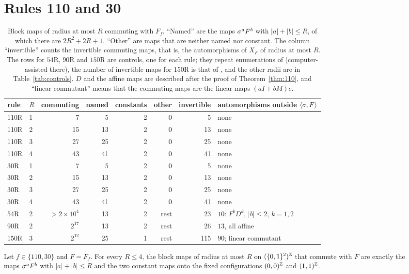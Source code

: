 \section{Rules 110 and 30}\label{sec:110}

\begin{table}[t]
\caption{Block maps of radius at most $R$ commuting with $F_f$. ``Named'' are the maps $\sigma^aF^b$ with $|a|+|b|\le R$, of which there are $2R^2+2R+1$. ``Other'' are maps that are neither named nor constant. The column ``invertible'' counts the invertible commuting maps, that is, the automorphisms of $X_F$ of radius at most $R$. The rows for $54$R, $90$R and $150$R are controls, one for each rule; they repeat enumerations of \cite{PaperC} (computer-assisted there), the number of invertible maps for $150$R is that of \cite{PaperC}, and the other radii are in Table~\ref{tab:controls}. $D$ and the affine maps are described after the proof of Theorem~\ref{thm:110}, and ``linear commutant'' means that the commuting maps are the linear maps $(aI+bM)c$.}
\label{tab:census}
\centering\small
\begin{tabular}{llrrrrrl}
\toprule
rule & $R$ & commuting & named & constants & other & invertible & automorphisms outside $\langle\sigma,F\rangle$\\
\midrule
110R & 1 & 7 & 5 & 2 & 0 & 5 & none\\
110R & 2 & 15 & 13 & 2 & 0 & 13 & none\\
110R & 3 & 27 & 25 & 2 & 0 & 25 & none\\
110R & 4 & 43 & 41 & 2 & 0 & 41 & none\\
30R & 1 & 7 & 5 & 2 & 0 & 5 & none\\
30R & 2 & 15 & 13 & 2 & 0 & 13 & none\\
30R & 3 & 27 & 25 & 2 & 0 & 25 & none\\
30R & 4 & 43 & 41 & 2 & 0 & 41 & none\\
54R & 2 & $>2\times10^4$ & 13 & 2 & rest & 23 & $10$: $F^bD^k$, $|b|\le2$, $k=1,2$\\
90R & 2 & $2^{17}$ & 13 & 2 & rest & 26 & $13$, all affine\\
150R & 3 & $2^{12}$ & 25 & 1 & rest & 115 & $90$; linear commutant\\
\bottomrule
\end{tabular}
\end{table}

\begin{theorem}\label{thm:110}
Let $f\in\{110,30\}$ and $F=F_f$. For every $R\le 4$, the block maps of radius at most $R$ on $(\{0,1\}^2)^{\mathbb{Z}}$ that commute with $F$ are exactly the maps $\sigma^aF^b$ with $|a|+|b|\le R$ and the two constant maps onto the fixed configurations $(0,0)^{\mathbb{Z}}$ and $(1,1)^{\mathbb{Z}}$.
\end{theorem}

